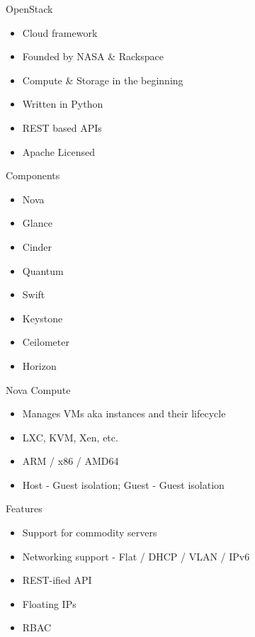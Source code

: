 \documentclass{beamer}
\begin{document}
\begin{frame}{OpenStack}
\begin{itemize}
 \item Cloud framework
 \item Founded by NASA \& Rackspace
 \item Compute \& Storage in the beginning
 \item Written in Python
 \item REST based APIs
 \item Apache Licensed
\end{itemize}
\end{frame}

\begin{frame}{Components}
\begin{itemize}
 \item Nova
 \pause 
 \item Glance
 \pause
 \item Cinder
 \pause
 \item Quantum
 \pause
 \item Swift
 \pause
 \item Keystone
 \pause
 \item Ceilometer
 \pause
 \item Horizon
\end{itemize}
\end{frame}

\begin{frame}{Nova Compute}
\begin{itemize}
 \item Manages VMs aka instances and their lifecycle
 \item LXC, KVM, Xen, etc.
 \item ARM / x86 / AMD64
 \item Host - Guest isolation; Guest - Guest isolation
\end{itemize}
\end{frame}

\begin{frame}{Features}
\begin{itemize}
 \item Support for commodity servers
 \item Networking support - Flat / DHCP / VLAN / IPv6
 \item REST-ified API
 \item Floating IPs
 \item RBAC
\end{itemize}
\end{frame}
\end{document}
